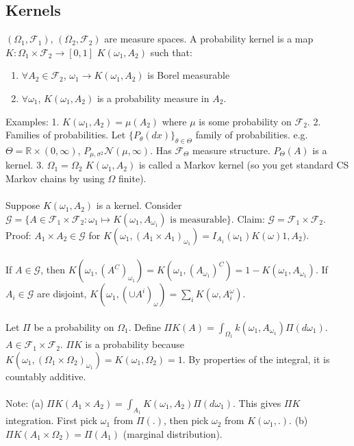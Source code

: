 \documentclass[12pt]{article}
\begin{document}
\subsection{Kernels}
$(\Omega_1, \mathcal{F}_1)$, $(\Omega_2, \mathcal{F}_2)$ are measure spaces.  A probability kernel is a map $K: \Omega_1 \times \mathcal{F}_2 \rightarrow [0,1]$ $K(\omega_1, A_2)$ such that:
\begin{enumerate}
\item $\forall A_2 \in \mathcal{F}_2$, $\omega_1 \rightarrow K(\omega_1, A_2)$ is Borel measurable
\item $\forall \omega_1$, $K(\omega_1, A_2)$ is a probability measure in $A_2$.
\end{enumerate}
Examples:
1.  $K(\omega_1, A_2) = \mu(A_2)$ where $\mu$ is some probability on $\mathcal{F}_2$.  2.  Families of probabilities.  Let $\{P_\theta(dx) \}_{\theta \in \Theta}$ family of probabilities.  e.g. $\Theta = \mathbb{R} \times (0, \infty)$, $P_{\mu, \sigma^2} \mathcal{N}(\mu, \infty)$.  Has $\mathcal{F}_\Theta$ measure structure.  $P_\Theta(A)$ is a kernel.  3.  $\Omega_1 = \Omega_2$ $K(\omega_1, A_2)$ is called a Markov kernel (so you get standard CS Markov chains by using $\Omega$ finite).
\\ \\
Suppose $K(\omega_1, A_2)$ is a kernel.  Consider $\mathcal{G} = \{ A \in \mathcal{F}_1 \times \mathcal{F}_2 : \omega_1 \mapsto K(\omega_1, A_{\omega_1}) \textrm{ is measurable} \}$.  Claim: $\mathcal{G} = \mathcal{F}_1 \times \mathcal{F}_2$.  Proof: $A_1 \times A_2 \in \mathcal{G}$ for $K(\omega_1, (A_1 \times A_1)_{\omega_1}) = I_{A_1}(\omega_1) K(\omega)1, A_2)$.
\\ \\
If $A \in \mathcal{G}$, then $K(\omega_1, (A^C)_{\omega_1}) = K(\omega_1, (A_{\omega_1})^C) = 1 - K(\omega_1, A_{\omega_1})$.  If $A_i \in \mathcal{G}$ are disjoint, $K(\omega_1, (\cup A^i)_\omega) = \sum_i K(\omega, A_i^\omega)$.
\\ \\
Let $\Pi$ be a probability on $\Omega_1$.  Define $\Pi K(A) = \int_{\Omega_1} k(\omega_1, A_{\omega_1}) \Pi(d \omega_1)$.  $A \in \mathcal{F}_1 \times \mathcal{F}_2$.  $\Pi K$ is a probability because $K(\omega_1, (\Omega_1 \times \Omega_2)_{\omega_1}) = K(\omega_1, \Omega_2) = 1$.  By properties of the integral, it is countably additive.
\\ \\
Note: (a) $\Pi K (A_1 \times A_2)  = \int_{A_1} K(\omega_1, A_2) \Pi(d \omega_1)$.  This gives $\Pi K$ integration.  First pick $\omega_1$ from $\Pi(.)$, then pick $\omega_2$ from $K(\omega_1, .)$.  (b) $\Pi K (A_1 \times \Omega_2) = \Pi(A_1)$ (marginal distribution).
\end{document}
